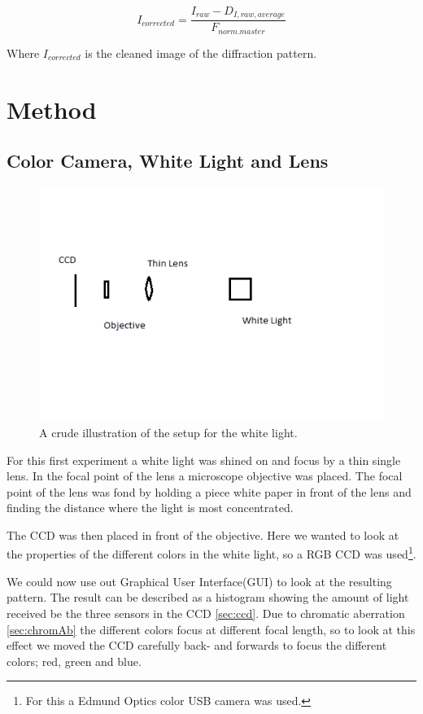 \documentclass{emulateapj}
\begin{document}
\begin{equation}
I_{corrected} = \frac{I_{raw} - D_{I,raw,average}}{F_{norm. master}}
\label{eq:ICorr}
\end{equation}

Where $I_{corrected}$ is the cleaned image of the diffraction pattern.
\section{Method}
\label{sec:method}

\subsection{Color Camera, White Light and Lens}

\begin{figure}[H]
\centering
\includegraphics[scale=0.4]{setupLight.png}
\caption{A crude illustration of the setup for the white light.}
\end{figure}

For this first experiment a white light was shined on and focus by a thin single lens. In the focal point of the lens a microscope objective was placed. The focal point of the lens was fond by holding a piece white paper in front of the lens and finding the distance where the light is most concentrated. 

The CCD was then placed in front of the objective. Here we wanted to look at the properties of the different colors in the white light, so a RGB CCD was used\footnote{For this a Edmund Optics color USB camera was used.}. 

We could now use out Graphical User Interface(GUI) to look at the resulting pattern. The result can be described as a histogram showing the amount of light received be the three sensors in the CCD \ref{sec:ccd}. Due to chromatic aberration \ref{sec:chromAb} the different colors focus at different focal length, so to look at this effect we moved the CCD carefully back- and forwards to focus the different colors; red, green and blue.
\end{document}
